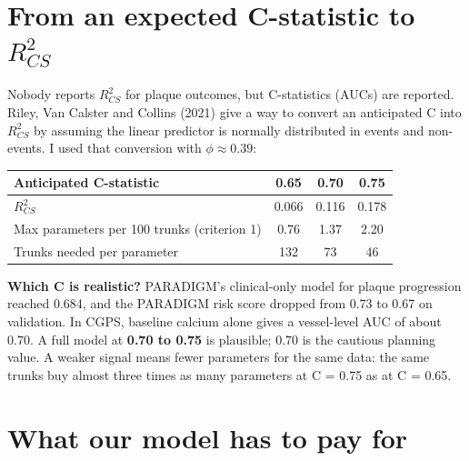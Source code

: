 \documentclass[11pt,a4paper]{article}
\begin{document}
\section{From an expected C-statistic to $R^2_{CS}$}

Nobody reports $R^2_{CS}$ for plaque outcomes, but C-statistics (AUCs) are reported. Riley, Van
Calster and Collins (2021) give a way to convert an anticipated C into $R^2_{CS}$ by assuming the
linear predictor is normally distributed in events and non-events. I used that conversion with
$\phi \approx 0.39$:

\begin{center}
\begin{tabular}{lccc}
\toprule
Anticipated C-statistic & 0.65 & 0.70 & 0.75 \\
\midrule
$R^2_{CS}$                                  & 0.066 & 0.116 & 0.178 \\
Max parameters per 100 trunks (criterion 1) & 0.76  & 1.37  & 2.20  \\
Trunks needed per parameter                 & 132   & 73    & 46    \\
\bottomrule
\end{tabular}
\end{center}

\textbf{Which C is realistic?} PARADIGM's clinical-only model for plaque progression reached 0.684,
and the PARADIGM risk score dropped from 0.73 to 0.67 on validation. In CGPS, baseline calcium alone
gives a vessel-level AUC of about 0.70. A full model at \textbf{0.70 to 0.75} is plausible; 0.70 is
the cautious planning value. A weaker signal means fewer parameters for the same data: the same
trunks buy almost three times as many parameters at C = 0.75 as at C = 0.65.

\section{What our model has to pay for}
\end{document}
